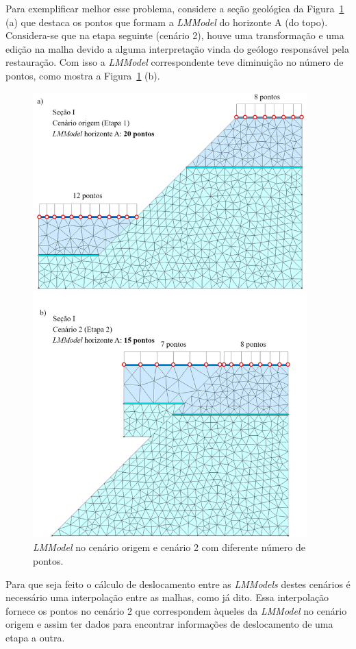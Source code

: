 Para exemplificar melhor esse problema, considere a seção geológica da Figura~\ref{fig-lmm-interp1} (a) que destaca os pontos que formam a \textit{LMModel} do horizonte A (do topo). Considera-se que na etapa seguinte (cenário 2), houve uma transformação e uma edição na malha devido a alguma interpretação vinda do geólogo responsável pela restauração. Com isso a \textit{LMModel} correspondente teve diminuição no número de pontos, como mostra a Figura~\ref{fig-lmm-interp1} (b).

\begin{figure} [H]
  \begin{center}
    \includegraphics[width=300pt]{images/fig-lmm-interp1}
    \caption{\textit{LMModel} no cenário origem e cenário 2 com diferente número de pontos.}\label{fig-lmm-interp1}
  \end{center}
\end{figure}

Para que seja feito o cálculo de deslocamento entre as \textit{LMModels} destes cenários é necessário uma interpolação entre as malhas, como já dito. Essa interpolação fornece os pontos no cenário 2 que correspondem àqueles da \textit{LMModel} no cenário origem e assim ter dados para encontrar informações de deslocamento de uma etapa a outra.

